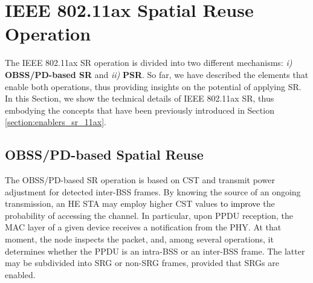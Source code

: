\documentclass{ieeeaccess}
\begin{document}

\section{IEEE 802.11ax Spatial Reuse Operation}
\label{section:operation_sr_11ax}
The IEEE 802.11ax SR operation is divided into two different mechanisms: \emph{i)} \textbf{OBSS/PD-based SR} and \emph{ii)} \textbf{PSR}. So far, we have described the elements that enable both operations, thus providing insights on the potential of applying SR. In this Section, we show the technical details of IEEE 802.11ax SR, thus embodying the concepts that have been previously introduced in Section \ref{section:enablers_sr_11ax}.

\subsection{OBSS/PD-based Spatial Reuse}
\label{section:obss_pd_based}
The OBSS/PD-based SR operation is based on CST and transmit power adjustment for detected inter-BSS frames. By knowing the source of an ongoing transmission, an HE STA may employ higher CST values \textcolor{black}{to improve} the probability of accessing the channel. In particular, upon PPDU reception, the MAC layer of a given device receives a notification from the PHY. At that moment, the node inspects the packet, and, among several operations, it determines whether the PPDU is an intra-BSS or an inter-BSS frame. The latter may be subdivided into SRG or non-SRG frames, provided that SRGs are enabled.

\end{document}
